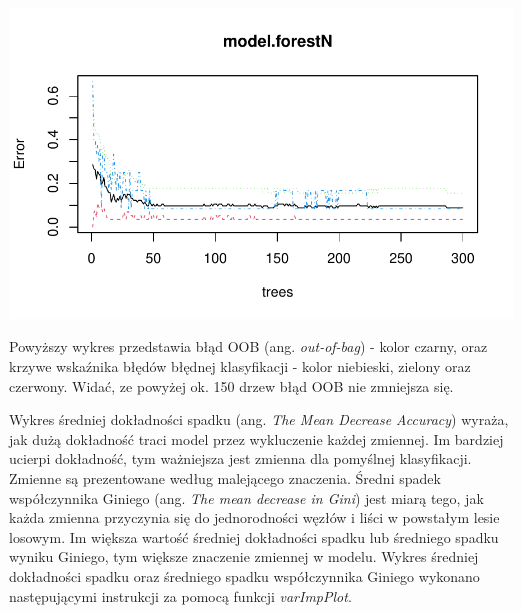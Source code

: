 \documentclass{amuthesis}
\begin{document}
\begin{center}\includegraphics[width=1\linewidth]{figures/unnamed-chunk-18-1} \end{center}

Powyższy wykres przedstawia błąd OOB (ang. \emph{out-of-bag}) - kolor czarny, oraz krzywe wskaźnika błędów błędnej klasyfikacji - kolor niebieski, zielony oraz czerwony. Widać, ze powyżej ok. 150 drzew błąd OOB nie zmniejsza się.

Wykres średniej dokładności spadku (ang. \emph{The Mean Decrease Accuracy}) wyraża, jak dużą dokładność traci model przez wykluczenie każdej zmiennej. Im bardziej ucierpi dokładność, tym ważniejsza jest zmienna dla pomyślnej klasyfikacji. Zmienne są prezentowane według malejącego znaczenia. Średni spadek współczynnika Giniego (ang. \emph{The mean decrease in Gini}) jest miarą tego, jak każda zmienna przyczynia się do jednorodności węzłów i liści w powstałym lesie losowym. Im większa wartość średniej dokładności spadku lub średniego spadku wyniku Giniego, tym większe znaczenie zmiennej w modelu.
Wykres średniej dokładności spadku oraz średniego spadku współczynnika Giniego wykonano następującymi instrukcji za pomocą funkcji \emph{varImpPlot}.

\begin{Shaded}
\begin{Highlighting}[]
\SpecialCharTok{::} \NormalTok{)}
\end{Highlighting}
\end{Shaded}
\end{document}
